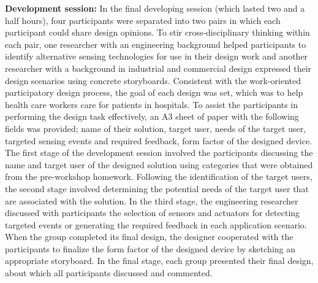 \textbf{Development session:} 
\newline
In the final developing session (which lasted two and a half hours), four participants were separated into two pairs in which each participant could share design opinions. To stir cross-disciplinary thinking within each pair, one researcher with an engineering background helped participants to identify alternative sensing technologies for use in their design work and another researcher with a background in industrial and commercial design expressed their design scenarios using concrete storyboards. Consistent with the work-oriented participatory design process, the goal of each design was set, which was to help health care workers care for patients in hospitals. To assist the participants in performing the design task effectively, an A3 sheet of paper with the following fields was provided; name of their solution, target user, needs of the target user, targeted sensing events and required feedback, form factor of the designed device. The first stage of the development session involved the participants discussing the name and target user of the designed solution using categories that were obtained from the pre-workshop homework. Following the identification of the target users, the second stage involved determining the potential needs of the target user that are associated with the solution. In the third stage, the engineering researcher discussed with participants the selection of sensors and actuators for detecting targeted events or generating the required feedback in each application scenario. When the group completed its final design, the designer cooperated with the participants to finalize the form factor of the designed device by sketching an appropriate storyboard. In the final stage, each group presented their final design, about which all participants discussed and commented. 

